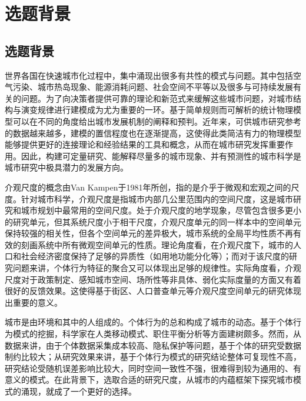 \chapter{选题背景}
\setcounter{page}{1}


\section{选题背景} %

世界各国在快速城市化过程中，集中涌现出很多有共性的模式与问题。其中包括空气污染、城市热岛现象、能源消耗问题、社会空间不平等以及很多与可持续发展有关的问题。为了向决策者提供可靠的理论和新范式来缓解这些城市问题，对城市结构与演变规律进行建模成为尤为重要的一环。基于简单规则而可解析的统计物理模型可以在不同的角度给出城市发展机制的阐释和预判。近年来，可供城市研究参考的数据越来越多，建模的置信程度也在逐渐提高，这使得此类简洁有力的物理模型能够提供更好的连接理论和经验结果的工具和概念，从而在城市研究发挥重要作用。因此，构建可定量研究、能解释尽量多的城市现象、并有预测性的城市科学是城市研究中极具潜力的发展方向。


介观尺度的概念由Van Kampen于1981年所创，指的是介乎于微观和宏观之间的尺度。针对城市科学，介观尺度是指城市内部几公里范围内的空间尺度，这是城市研究和城市规划中最常用的空间尺度。处于介观尺度的地学现象，尽管包含很多更小的研究单元，但其系统尺度小于相干尺度，介观尺度单元的同一样本中的空间单元保持较强的相关性，但各个空间单元的差异极大，城市系统的全局平均性质不再有效的刻画系统中所有微观空间单元的性质。理论角度看，在介观尺度下，城市的人口和社会经济密度保持了足够的异质性（如用地功能分化等）；而对于该尺度的研究问题来讲，个体行为特征的聚合又可以体现出足够的规律性。实际角度看，介观尺度对于政策制定、感知城市空间、场所性等非具体、弱化实际度量的方面又有着很好的反馈效果。这使得基于街区、人口普查单元等介观尺度空间单元的研究体现出重要的意义。


城市是由环境和其中的人组成的。个体行为的总和构成了城市的动态。基于个体行为模式的挖掘，科学家在人类移动模式、职住平衡分析等方面建树颇多。然而，从数据来讲，由于个体数据采集成本较高、隐私保护等问题，基于个体的研究受数据制约比较大；从研究效果来讲，基于个体行为模式的研究结论整体可复现性不高，研究结论受随机误差影响比较大，同时空间一致性不强，很难得到较为通用的、有意义的模式。在此背景下，选取合适的研究尺度，从城市的内蕴框架下探究城市模式的涌现，就成了一个更好的选择。


